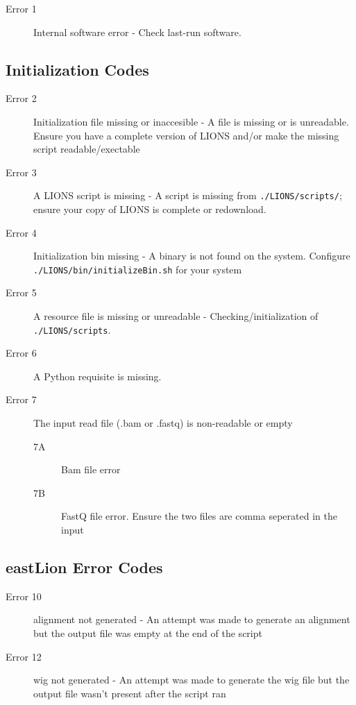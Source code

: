 \documentclass[11pt]{scrartcl}
\begin{document}

\begin{description}
\item[Error 1] Internal software error - Check last-run software.
\end{description}

\subsection{Initialization Codes}
\begin{description}


\item[Error 2] Initialization file missing or inaccesible -
  A file is missing or is unreadable. Ensure you have a complete version of LIONS and/or
make the missing script readable/exectable

\item[Error 3] A LIONS script is missing -
  A script is missing from \texttt{./LIONS/scripts/}; ensure your copy of LIONS is
complete or redownload.

\item[Error 4] Initialization bin missing -
  A binary is not found on the system. Configure \texttt{./LIONS/bin/initializeBin.sh} for your system

\item[Error 5] A resource file is missing or unreadable - 
  Checking/initialization of \texttt{./LIONS/scripts}.

\item[Error 6] A Python requisite is missing.

\item[Error 7] The input read file (.bam or .fastq) is non-readable or empty
\begin{description}
\item[7A] Bam file error
\item[7B] FastQ file error. Ensure the two files are comma seperated in the input
\end{description}
\end{description}

\subsection{eastLion Error Codes}

\begin{description}
\item[Error 10] alignment not generated -
  An attempt was made to generate an alignment but the output file was
empty at the end of the script

\item[Error 12] wig not generated -
  An attempt was made to generate the wig file but the output file wasn't
present after the script ran
\end{description}
\end{document}
